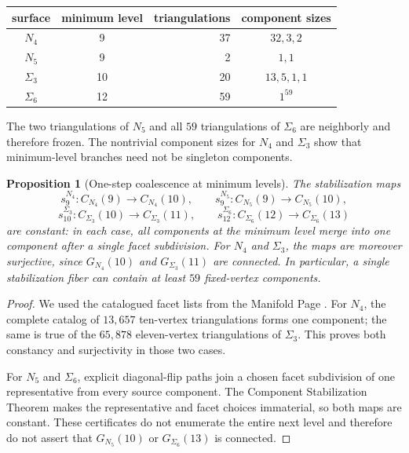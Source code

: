 \documentclass[11pt]{article}
\newtheorem{proposition}[theorem]{Proposition}
\theoremstyle{remark}
\theoremstyle{plain}
\begin{document}
\begin{center}
\begin{tabular}{c|c|r|c}
surface & minimum level & triangulations & component sizes \\ \hline
\(N_4\)       & 9  & 37 & \(32,3,2\) \\
\(N_5\)       & 9  & 2  & \(1,1\) \\
\(\Sigma_3\)  & 10 & 20 & \(13,5,1,1\) \\
\(\Sigma_6\)  & 12 & 59 & \(1^{59}\)
\end{tabular}
\end{center}

The two triangulations of \(N_5\) and all \(59\) triangulations of
\(\Sigma_6\) are neighborly and therefore frozen.  The nontrivial component
sizes for \(N_4\) and \(\Sigma_3\) show that minimum-level branches need not
be singleton components.

\begin{proposition}[One-step coalescence at minimum levels]
\label{prop:surface-coalescence}
The stabilization maps
\[
 s_9^{N_4}:C_{N_4}(9)\to C_{N_4}(10),\qquad
 s_9^{N_5}:C_{N_5}(9)\to C_{N_5}(10),
\]
\[
 s_{10}^{\Sigma_3}:C_{\Sigma_3}(10)\to C_{\Sigma_3}(11),\qquad
 s_{12}^{\Sigma_6}:C_{\Sigma_6}(12)\to C_{\Sigma_6}(13)
\]
are constant: in each case, all components at the minimum level merge into
one component after a single facet subdivision.  For \(N_4\)
and \(\Sigma_3\), the maps are moreover surjective, since
\(G_{N_4}(10)\) and \(G_{\Sigma_3}(11)\) are
connected.  In particular, a single stabilization fiber can contain at least
\(59\) fixed-vertex components.
\end{proposition}

\begin{proof}
We used the catalogued facet lists from the Manifold Page \cite{LutzSurf}.
For \(N_4\), the complete catalog of \(13{,}657\) ten-vertex triangulations
forms one component; the same is true of the \(65{,}878\) eleven-vertex
triangulations of \(\Sigma_3\).  This proves both constancy and surjectivity
in those two cases.

For \(N_5\) and \(\Sigma_6\), explicit diagonal-flip paths join a chosen
facet subdivision of one representative from every source component.  The
Component Stabilization Theorem makes the representative and facet choices
immaterial, so both maps are constant.  These certificates do not enumerate
the entire next level and therefore do not assert that
\(G_{N_5}(10)\) or \(G_{\Sigma_6}(13)\) is connected.
\end{proof}
\end{document}

